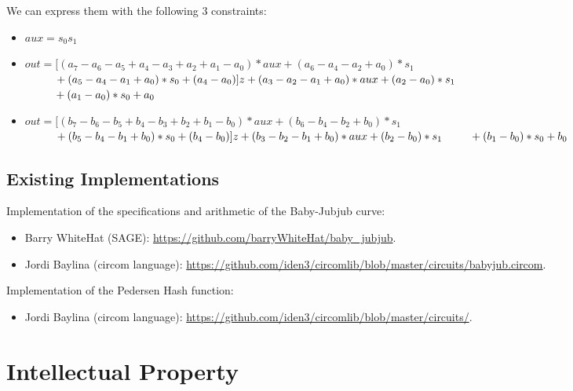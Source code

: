 \documentclass{article}
\begin{document}
\begin{spacing}{1.2}
	\noi We can express them with the following 3 constraints:
	\begin{itemize}
		\item 	$aux = s_0 s_1$ %
		\item 	$out = [ (a_7-a_6-a_5+a_4-a_3+a_2+a_1-a_0)*aux 
		+ (a_6-a_4-a_2+a_0)*s_1$ \\
		$\text{\qquad\;\;} + (a_5-a_4-a_1+a_0)*s_0
		+ (a_4 - a_0) ] z 
		+ (a_3-a_2-a_1+a_0)*aux + (a_2-a_0)*s_1 $\\
		$\text{\qquad\;\;} + (a_1-a_0)*s_0+ a_0$
		\item	$ out = [ (b_7-b_6-b_5+b_4-b_3+b_2+b_1-b_0)*aux 
		+ (b_6-b_4-b_2+b_0)*s_1$ \\
		$\text{\qquad\;\;} + (b_5-b_4-b_1+b_0)*s_0 
		+ (b_4 - b_0)] z 
		+ (b_3-b_2-b_1+b_0)*aux + (b_2-b_0)*s_1 \\
		\text{\qquad\;\:} + (b_1-b_0)*s_0+ b_0$\\
	\end{itemize}
	
	\subsection{Existing Implementations}
	
	Implementation of the specifications and arithmetic of the Baby-Jubjub curve: 
	\begin{itemize}
		\item Barry WhiteHat (SAGE):
		\url{https://github.com/barryWhiteHat/baby_jubjub}.
		\item Jordi Baylina (circom language):
		\url{https://github.com/iden3/circomlib/blob/master/circuits/babyjub.circom}.
	\end{itemize}
	Implementation of the Pedersen Hash function: 
	\begin{itemize}
		\item Jordi Baylina (circom language):
		\url{https://github.com/iden3/circomlib/blob/master/circuits/}.
	\end{itemize}

\section {Intellectual Property}





\end{spacing}
\end{document}
